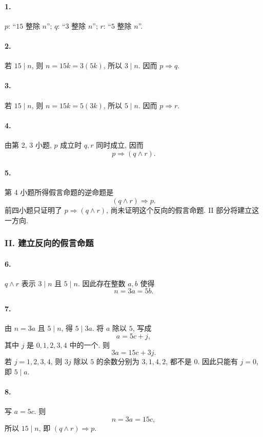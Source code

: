 \documentclass[usesamecnt, thmcnt=section, lang=cn, newtx, 10pt, scheme=chinese]{elegantbook}
\begin{document}
\paragraph*{1.}
$p$: ``$15$ 整除 $n$''; $q$: ``$3$ 整除 $n$''; $r$: ``$5$ 整除 $n$''.

\paragraph*{2.}
若 $15\mid n$, 则 $n=15k=3(5k)$, 所以 $3\mid n$. 因而 $p\Rightarrow q$.

\paragraph*{3.}
若 $15\mid n$, 则 $n=15k=5(3k)$, 所以 $5\mid n$. 因而 $p\Rightarrow r$.

\paragraph*{4.}
由第 2, 3 小题, $p$ 成立时 $q,r$ 同时成立, 因而
\[
 p\Rightarrow(q\wedge r).
\]

\paragraph*{5.}
第 4 小题所得假言命题的逆命题是
\[
 (q\wedge r)\Rightarrow p.
\]
前四小题只证明了 $p\Rightarrow(q\wedge r)$, 尚未证明这个反向的假言命题. II 部分将建立这一方向.

\subsubsection*{II. 建立反向的假言命题}

\paragraph*{6.}
$q\wedge r$ 表示 $3\mid n$ 且 $5\mid n$. 因此存在整数 $a,b$ 使得
\[
 n=3a=5b.
\]

\paragraph*{7.}
由 $n=3a$ 且 $5\mid n$, 得 $5\mid3a$. 将 $a$ 除以 $5$, 写成
\[
 a=5c+j,
\]
其中 $j$ 是 $0,1,2,3,4$ 中的一个.
则
\[
 3a=15c+3j.
\]
若 $j=1,2,3,4$, 则 $3j$ 除以 $5$ 的余数分别为 $3,1,4,2$, 都不是 $0$. 因此只能有 $j=0$, 即 $5\mid a$.

\paragraph*{8.}
写 $a=5c$. 则
\[
 n=3a=15c,
\]
所以 $15\mid n$, 即 $(q\wedge r)\Rightarrow p$.
\end{document}
